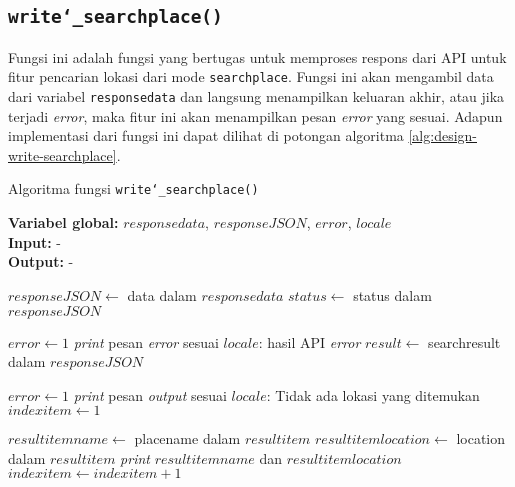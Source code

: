 \subsection{\texttt{write\char`_searchplace()}}
\label{sec:design-code-write-searchplace}

Fungsi ini adalah fungsi yang bertugas untuk memproses respons dari API untuk fitur pencarian lokasi dari mode \verb|searchplace|. Fungsi ini akan mengambil data dari variabel \verb|responsedata| dan langsung menampilkan keluaran akhir, atau jika terjadi \textit{error}, maka fitur ini akan menampilkan pesan \textit{error} yang sesuai. Adapun implementasi dari fungsi ini dapat dilihat di potongan algoritma \ref{alg:design-write-searchplace}.

\begin{algorithm}[h]
	\caption{Algoritma fungsi \texttt{write\char`_searchplace()}}
	\label{alg:design-write-searchplace}
	\vspace{-0.6\baselineskip}
	\begin{flushleft}
		\textbf{Variabel global:} $responsedata$, $responseJSON$, $error$, $locale$ \\
		\textbf{Input:} - \\
		\textbf{Output:} - \\
	\end{flushleft}
	\vspace{-1.05\baselineskip}
	\begin{algorithmic}
		\State $responseJSON \gets$ data dalam $responsedata$
		\State $status \gets$ \textquotesingle\textquotesingle status\textquotesingle\textquotesingle\xspace dalam $responseJSON$
		
			\State $error \gets 1$
			\State \textit{print} pesan \textit{error} sesuai $locale$: hasil API \textit{error}
		\Else
			\State $result \gets$ \textquotesingle\textquotesingle searchresult\textquotesingle\textquotesingle\xspace dalam $responseJSON$
			
				\State $error \gets 1$
				\State \textit{print} pesan \textit{output} sesuai $locale$: Tidak ada lokasi yang ditemukan
			\Else
				\State $indexitem \gets 1$
				
				 
					\State $resultitemname \gets$ \textquotesingle\textquotesingle placename\textquotesingle\textquotesingle\xspace dalam $resultitem$
					\State $resultitemlocation \gets$ \textquotesingle\textquotesingle location\textquotesingle\textquotesingle\xspace dalam $resultitem$
					\State \textit{print} $resultitemname$ dan $resultitemlocation$
					\State $indexitem \gets indexitem + 1$
				\EndFor
			\EndIf
		\EndIf
	\end{algorithmic}
\end{algorithm}
	
